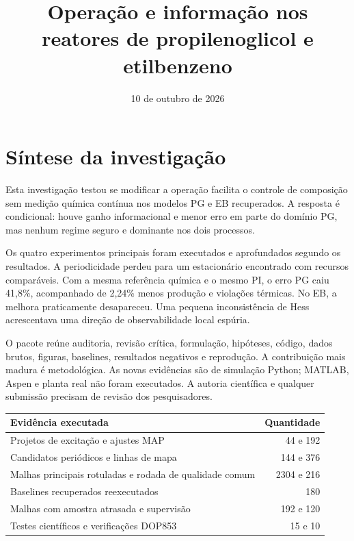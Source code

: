 \documentclass[
  11pt,
  letterpaper,
]{article}
\title{Operação e informação nos reatores de propilenoglicol e
etilbenzeno}
\author{}
\date{10 de outubro de 2026}
\begin{document}
\maketitle

\hypertarget{suxedntese-da-investigauxe7uxe3o}{%
\section{Síntese da
investigação}\label{suxedntese-da-investigauxe7uxe3o}}

Esta investigação testou se modificar a operação facilita o controle de
composição sem medição química contínua nos modelos PG e EB recuperados.
A resposta é condicional: houve ganho informacional e menor erro em
parte do domínio PG, mas nenhum regime seguro e dominante nos dois
processos.

Os quatro experimentos principais foram executados e aprofundados
segundo os resultados. A periodicidade perdeu para um estacionário
encontrado com recursos comparáveis. Com a mesma referência química e o
mesmo PI, o erro PG caiu 41,8\%, acompanhado de 2,24\% menos produção e
violações térmicas. No EB, a melhora praticamente desapareceu. Uma
pequena inconsistência de Hess acrescentava uma direção de
observabilidade local espúria.

O pacote reúne auditoria, revisão crítica, formulação, hipóteses,
código, dados brutos, figuras, baselines, resultados negativos e
reprodução. A contribuição mais madura é metodológica. As novas
evidências são de simulação Python; MATLAB, Aspen e planta real não
foram executados. A autoria científica e qualquer submissão precisam de
revisão dos pesquisadores.

\begin{longtable}[]{@{}lr@{}}
\toprule\noalign{}
Evidência executada & Quantidade \\
\midrule\noalign{}
\endhead
\bottomrule\noalign{}
\endlastfoot
Projetos de excitação e ajustes MAP & 44 e 192 \\
Candidatos periódicos e linhas de mapa & 144 e 376 \\
Malhas principais rotuladas e rodada de qualidade comum & 2304 e 216 \\
Baselines recuperados reexecutados & 180 \\
Malhas com amostra atrasada e supervisão & 192 e 120 \\
Testes científicos e verificações DOP853 & 15 e 10 \\
\end{longtable}
\end{document}
